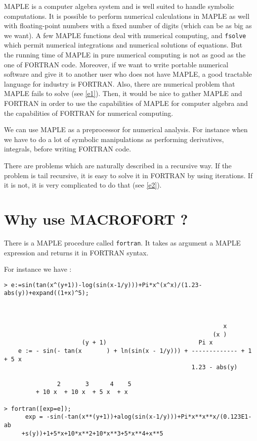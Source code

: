 MAPLE is a computer algebra system and is well suited  to handle symbolic
computations. It is possible to perform numerical calculations in MAPLE
as well with floating-point numbers with a fixed number of digits (which 
can be as big as we want). A few MAPLE functions deal with numerical
computing,  and {\tt fsolve} which permit numerical 
integrations and numerical solutions of equations. But 
the running time of MAPLE in pure numerical computing is not as good as
the one of FORTRAN code. Moreover, if we want to write portable numerical
software and give it to another user who does not have MAPLE,
a good tractable language for industry is FORTRAN. 
Also, there are numerical problem that MAPLE fails to solve (see \ref{e1}).
Then, it would be nice to gather MAPLE and FORTRAN
in order to use the capabilities of MAPLE for computer algebra and the
capabilities of FORTRAN for numerical computing.

We can use MAPLE as a preprocessor for numerical analysis. 
For instance when we have to do a lot of symbolic manipulations as performing 
derivatives, integrals, before writing FORTRAN code.

There are problems which are naturally described in a recursive way.
If the problem is tail recursive, it is easy to solve it
in FORTRAN by using iterations. If it is not,
it is very complicated to do that (see \ref{e2}).

\section{Why use MACROFORT ?}
\label{whym}

There is a MAPLE procedure called {\tt fortran}.
It takes as argument a MAPLE expression and returns it in FORTRAN syntax.

For instance we have :
\begin{verbatim}
> e:=sin(tan(x^(y+1))-log(sin(x-1/y)))+Pi*x^(x^x)/(1.23-abs(y))+expand((1+x)^5);



                                                              x
                                                           (x )
                      (y + 1)                          Pi x
    e := - sin(- tan(x       ) + ln(sin(x - 1/y))) + ------------- + 1 + 5 x
                                                     1.23 - abs(y)

               2       3      4    5
         + 10 x  + 10 x  + 5 x  + x

> fortran([exp=e]);
      exp = -sin(-tan(x**(y+1))+alog(sin(x-1/y)))+Pi*x**x**x/(0.123E1-ab
     +s(y))+1+5*x+10*x**2+10*x**3+5*x**4+x**5
\end{verbatim}

